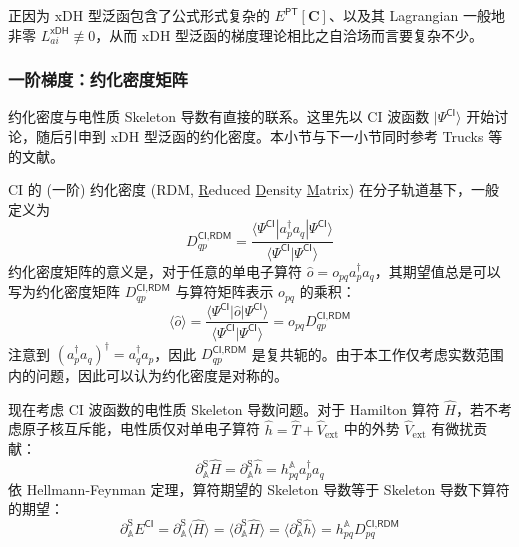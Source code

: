 正因为 xDH 型泛函包含了公式形式复杂的 $E^\textsf{PT} [\mathbf{C}]$、以及其 Lagrangian 一般地非零 $L_{ai}^\textsf{xDH} \not \equiv 0$，从而 xDH 型泛函的梯度理论相比之自洽场而言要复杂不少。

\subsubsection{一阶梯度：约化密度矩阵}

约化密度与电性质 Skeleton 导数有直接的联系。这里先以 CI 波函数 $| \Psi^\textsf{CI} \rangle$ 开始讨论，随后引申到 xDH 型泛函的约化密度。本小节与下一小节同时参考 Trucks 等的文献\cite{Trucks-Bartlett.CPL.1988}。

CI 的 (一阶) 约化密度 (RDM, \underline{R}educed \underline{D}ensity \underline{M}atrix) 在分子轨道基下，一般定义为
\begin{equation}
  \label{eq.def.rdm-ci}
  D_{qp}^{\textsf{CI},\textsf{RDM}} = \frac{\langle \Psi^\textsf{CI} | a_p^\dagger a_q | \Psi^\textsf{CI} \rangle}{\langle \Psi^\textsf{CI} | \Psi^\textsf{CI} \rangle}
\end{equation}
约化密度矩阵的意义是，对于任意的单电子算符 $\hat o = o_{pq} a_p^\dagger a_q$，其期望值总是可以写为约化密度矩阵 $D_{qp}^{\textsf{CI},\textsf{RDM}}$ 与算符矩阵表示 $o_{pq}$ 的乘积：
\begin{equation*}
  \langle \hat o \rangle = \frac{\langle \Psi^\textsf{CI} | \hat o | \Psi^\textsf{CI} \rangle}{\langle \Psi^\textsf{CI} | \Psi^\textsf{CI} \rangle} = o_{pq} D_{qp}^{\textsf{CI},\textsf{RDM}}
\end{equation*}
注意到 $(a_p^\dagger a_q)^\dagger = a_q^\dagger a_p$，因此 $D_{qp}^{\textsf{CI},\textsf{RDM}}$ 是复共轭的。由于本工作仅考虑实数范围内的问题，因此可以认为约化密度是对称的。

现在考虑 CI 波函数的电性质 Skeleton 导数问题。对于 Hamilton 算符 $\hat H$，若不考虑原子核互斥能，电性质仅对单电子算符 $\hat h = \hat T + \hat V_\mathrm{ext}$ 中的外势 $\hat V_\mathrm{ext}$ 有微扰贡献：
\begin{equation}
  \partial_\mathbb{A}^\mathrm{S} \hat H = \partial_\mathbb{A}^\mathrm{S} \hat h = h_{pq}^\mathbb{A} a_p^\dagger a_q
\end{equation}
依 Hellmann-Feynman 定理，算符期望的 Skeleton 导数等于 Skeleton 导数下算符的期望：
\begin{equation}
  \partial_\mathbb{A}^\mathrm{S} E^\textsf{CI} = \partial_\mathbb{A}^\mathrm{S} \langle \hat H \rangle = \langle \partial_\mathbb{A}^\mathrm{S} \hat H \rangle = \langle \partial_\mathbb{A}^\mathrm{S} \hat h \rangle = h_{pq}^\mathbb{A} D_{pq}^{\textsf{CI}, \textsf{RDM}}
\end{equation}

